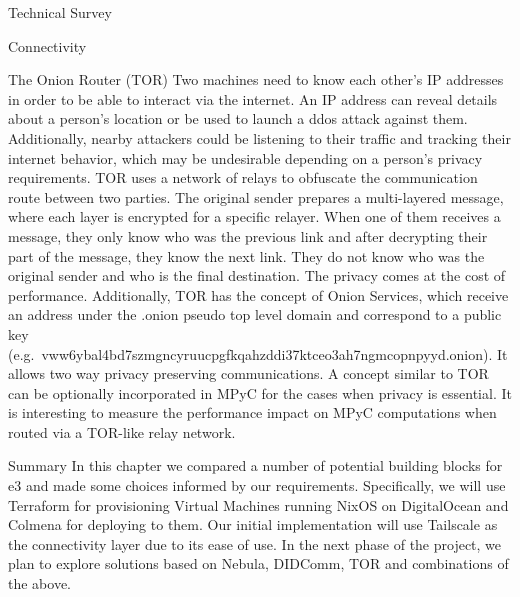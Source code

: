 \begin{frame}{Technical Survey}
\begin{block}{Connectivity}
\begin{block}{The Onion Router (TOR)}
\protect\hypertarget{the-onion-router-tor}{}
Two machines need to know each other's IP addresses in order to be able
to interact via the internet. An IP address can reveal details about a
person's location or be used to launch a \gls{ddos} attack against them.
Additionally, nearby attackers could be listening to their traffic and
tracking their internet behavior, which may be undesirable depending on
a person's privacy requirements. TOR uses a network of relays to
obfuscate the communication route between two parties. The original
sender prepares a multi-layered message, where each layer is encrypted
for a specific relayer. When one of them receives a message, they only
know who was the previous link and after decrypting their part of the
message, they know the next link. They do not know who was the original
sender and who is the final destination. The privacy comes at the cost
of performance. Additionally, TOR has the concept of Onion Services,
which receive an address under the .onion pseudo top level domain and
correspond to a public key
(e.g.~vww6ybal4bd7szmgncyruucpgfkqahzddi37ktceo3ah7ngmcopnpyyd.onion).
It allows two way privacy preserving communications. A concept similar
to TOR can be optionally incorporated in MPyC for the cases when privacy
is essential. It is interesting to measure the performance impact on
MPyC computations when routed via a TOR-like relay network.
\end{block}
\end{block}

\begin{block}{Summary}
\protect\hypertarget{summary}{}
In this chapter we compared a number of potential building blocks for
\gls{e3} and made some choices informed by our requirements.
Specifically, we will use Terraform for provisioning Virtual Machines
running NixOS on DigitalOcean and Colmena for deploying to them. Our
initial implementation will use Tailscale as the connectivity layer due
to its ease of use. In the next phase of the project, we plan to explore
solutions based on Nebula, DIDComm, TOR and combinations of the above.
\end{block}
\end{frame}


